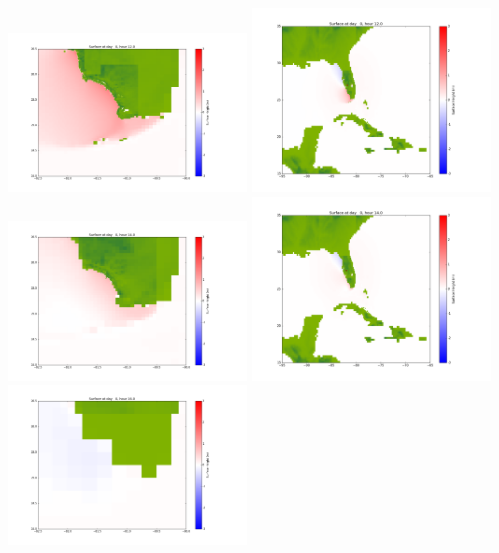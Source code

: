 \documentclass[11pt]{article}
\begin{document}
\vskip 10pt 
\includegraphics[width=0.475\textwidth]{frame0030fig1001.png}
\includegraphics[width=0.475\textwidth]{frame0030fig1002.png}
\vskip 10pt 
\includegraphics[width=0.475\textwidth]{frame0031fig1001.png}
\includegraphics[width=0.475\textwidth]{frame0031fig1002.png}
\vskip 10pt 
\includegraphics[width=0.475\textwidth]{frame0032fig1001.png}
\end{document}
